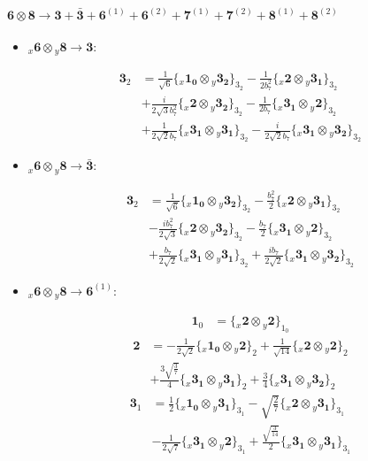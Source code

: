 \documentclass[english]{article}
\newcommand{\cgEqFontsize}{\large}
\newcommand{\rep}[1]{\mathbf{#1}}
\newcommand{\repx}[2]{{}_{#2}\mathbf{#1}}
\newcommand{\tsprod}[2]{\rep{#1}\otimes\rep{#2}}
\newcommand{\tsprodx}[2]{\repx{#1}{x}\otimes\repx{#2}{y}}
\newcommand{\subcgs}[3]{\big\{ \tsprodx{#1}{#2}\big\}^{}_{#3}}
\begin{document}
\paragraph*{\cgEqFontsize $\tsprod{6}{8}\to\rep{3}+\rep{\bar{3}}+\rep{6}^{(1)}+\rep{6}^{(2)}+\rep{7}^{(1)}+\rep{7}^{(2)}+\rep{8}^{(1)}+\rep{8}^{(2)}$}
\begin{itemize}
\item $\tsprodx{6}{8}\to\rep{3}$:
\begin{fleqn}
\begin{align*}
\rep{3}_{2} & = \frac{1}{\sqrt{6}}\subcgs{1_{0}}{3_{2}}{3_{2}}-\frac{1}{2 b_7^2}\subcgs{2}{3_{1}}{3_{2}} \\ 
 & +\frac{i}{2 \sqrt{3} b_7^2}\subcgs{2}{3_{2}}{3_{2}}-\frac{1}{2 b_7}\subcgs{3_{1}}{2}{3_{2}} \\ 
 & +\frac{1}{2 \sqrt{2} b_7}\subcgs{3_{1}}{3_{1}}{3_{2}}-\frac{i}{2 \sqrt{2} b_7}\subcgs{3_{1}}{3_{2}}{3_{2}}
\end{align*}
\end{fleqn}
\item $\tsprodx{6}{8}\to\rep{\bar{3}}$:
\begin{fleqn}
\begin{align*}
\rep{3}_{2} & = \frac{1}{\sqrt{6}}\subcgs{1_{0}}{3_{2}}{3_{2}}-\frac{b_7^2}{2}\subcgs{2}{3_{1}}{3_{2}} \\ 
 & -\frac{i b_7^2}{2 \sqrt{3}}\subcgs{2}{3_{2}}{3_{2}}-\frac{b_7}{2}\subcgs{3_{1}}{2}{3_{2}} \\ 
 & +\frac{b_7}{2 \sqrt{2}}\subcgs{3_{1}}{3_{1}}{3_{2}}+\frac{i b_7}{2 \sqrt{2}}\subcgs{3_{1}}{3_{2}}{3_{2}}
\end{align*}
\end{fleqn}
\item $\tsprodx{6}{8}\to\rep{6}^{(1)}$:
\begin{fleqn}
\begin{align*}
\rep{1}_{0} & = \subcgs{2}{2}{1_{0}}
\end{align*}
\begin{align*}
\rep{2} & = -\frac{1}{2 \sqrt{2}}\subcgs{1_{0}}{2}{2}+\frac{1}{\sqrt{14}}\subcgs{2}{2}{2} \\ 
 & +\frac{3 \sqrt{\frac{3}{7}}}{4}\subcgs{3_{1}}{3_{1}}{2}+\frac{3}{4}\subcgs{3_{1}}{3_{2}}{2}
\end{align*}
\begin{align*}
\rep{3}_{1} & = \frac{1}{2}\subcgs{1_{0}}{3_{1}}{3_{1}}-\sqrt{\frac{2}{7}}\subcgs{2}{3_{1}}{3_{1}} \\ 
 & -\frac{1}{2 \sqrt{7}}\subcgs{3_{1}}{2}{3_{1}}+\frac{\sqrt{\frac{3}{14}}}{2}\subcgs{3_{1}}{3_{1}}{3_{1}} \\ 

\end{align*}
\end{fleqn}
\end{itemize}
\end{document}
